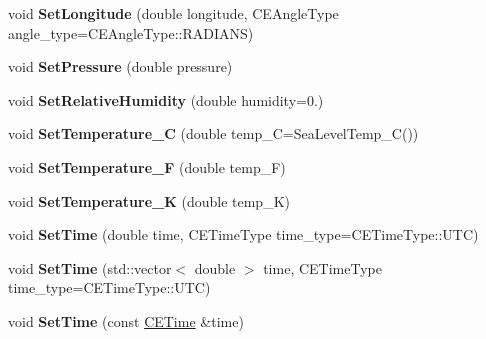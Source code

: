 \begin{DoxyCompactItemize}
\item 
\hypertarget{class_c_e_observer_a40e741466ce87863ec15ca61a8a37ab9}{}void {\bfseries Set\+Longitude} (double longitude, C\+E\+Angle\+Type angle\+\_\+type=C\+E\+Angle\+Type\+::\+R\+A\+D\+I\+A\+N\+S)\label{class_c_e_observer_a40e741466ce87863ec15ca61a8a37ab9}

\item 
\hypertarget{class_c_e_observer_a2617ccc51969fc2dd67391980df74536}{}void {\bfseries Set\+Pressure} (double pressure)\label{class_c_e_observer_a2617ccc51969fc2dd67391980df74536}

\item 
\hypertarget{class_c_e_observer_ad08a91ef1fa3734b181f6ac5327d5327}{}void {\bfseries Set\+Relative\+Humidity} (double humidity=0.)\label{class_c_e_observer_ad08a91ef1fa3734b181f6ac5327d5327}

\item 
\hypertarget{class_c_e_observer_adc07bc172149ebd37ec7deb2f4bc512a}{}void {\bfseries Set\+Temperature\+\_\+\+C} (double temp\+\_\+\+C=Sea\+Level\+Temp\+\_\+\+C())\label{class_c_e_observer_adc07bc172149ebd37ec7deb2f4bc512a}

\item 
\hypertarget{class_c_e_observer_a4a152fd4044cd63b4b28131035def02d}{}void {\bfseries Set\+Temperature\+\_\+\+F} (double temp\+\_\+\+F)\label{class_c_e_observer_a4a152fd4044cd63b4b28131035def02d}

\item 
\hypertarget{class_c_e_observer_ab917e7c63bb9bef866e34d534fde7d5c}{}void {\bfseries Set\+Temperature\+\_\+\+K} (double temp\+\_\+\+K)\label{class_c_e_observer_ab917e7c63bb9bef866e34d534fde7d5c}

\item 
\hypertarget{class_c_e_observer_a2f25b5a0e90d3dddbf8f571c9fda6d54}{}void {\bfseries Set\+Time} (double time, C\+E\+Time\+Type time\+\_\+type=C\+E\+Time\+Type\+::\+U\+T\+C)\label{class_c_e_observer_a2f25b5a0e90d3dddbf8f571c9fda6d54}

\item 
\hypertarget{class_c_e_observer_ae86c248f4aa22ab26b52a5d7f7a060dd}{}void {\bfseries Set\+Time} (std\+::vector$<$ double $>$ time, C\+E\+Time\+Type time\+\_\+type=C\+E\+Time\+Type\+::\+U\+T\+C)\label{class_c_e_observer_ae86c248f4aa22ab26b52a5d7f7a060dd}

\item 
\hypertarget{class_c_e_observer_ac01ca4941f77103eeae169c7672f128b}{}void {\bfseries Set\+Time} (const \hyperlink{class_c_e_time}{C\+E\+Time} \&time)\label{class_c_e_observer_ac01ca4941f77103eeae169c7672f128b}


\end{DoxyCompactItemize}

